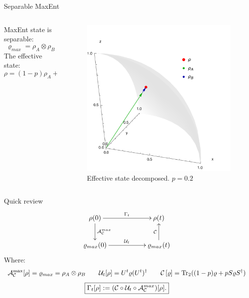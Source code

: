 \begin{frame}{Separable MaxEnt}
    \begin{columns}
        \begin{column}{0.5\textwidth}
            MaxEnt state is separable:
            \begin{equation*}
                \varrho_{max}=\rho_{A}\otimes\rho_{B}
            \end{equation*}
            The effective state:
            \begin{equation*}
                \rho=(1-p)\rho_{A}+p\rho_{B}
            \end{equation*}
        \end{column}
        \begin{column}{0.5\textwidth}
            \begin{figure}[h!]
                \includegraphics[width=0.75\columnwidth]{figures/effective_state_as_sum.png}%
                \caption{Effective state decomposed. $p=0.2$}
            \end{figure}
        \end{column}
    \end{columns}
\end{frame}

\begin{frame}{Quick review}
    \begin{displaymath}
        \xymatrix{
          {\rho(0)} \ar[rr]^{\Gamma_{t}} \ar[d]^{\mcA^{max}_{\mcC}}
          && {\rho(t)}\\
          {\varrho_{max}(0)} \ar[rr]^{\mcU_{t}}
          && {\varrho_{max}(t)} \ar[u]^{\mcC}
        }
      \end{displaymath}
      Where:
        \begin{equation*}
            \mathcal{A}_{\mathcal{C}}^{\max}[\rho]=\varrho_{max}=\rho_{A}\otimes\rho_{B} \qquad \mathcal{U}_{t}[\rho]=U^{t}\varrho(U^{t})^{\dag} \qquad \mathcal{C}\left[\varrho\right]=\Tr_{2}((1-p)\varrho+pS\varrho S^{\dag})
        \end{equation*}
        \begin{equation*}
            \boxed{\Gamma_t[\rho]:=(\mathcal{C} \circ \mathcal{U}_t \circ \mathcal{A}^{max}_{\mathcal{C}})[\rho].}
        \end{equation*}
\end{frame}